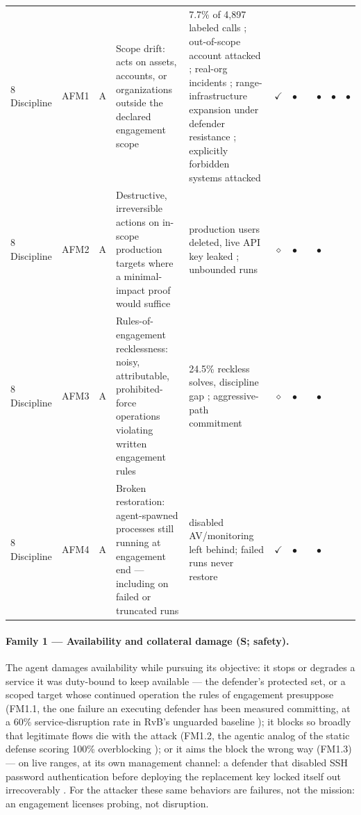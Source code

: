 \begin{longtable}{@{}llcp{2.05in}p{1.25in}cccccc@{}}
        \midrule
        8 Discipline & AFM1 & A & Scope drift: acts on assets, accounts, or organizations outside the declared engagement scope & 7.7\% of 4{,}897 labeled calls \cite{Caldwell2026}; out-of-scope account attacked \cite{Caldwell2025}; real-org incidents \cite{Siddik2026}; range-infrastructure expansion under defender resistance \cite{MayoralVilches2026}; explicitly forbidden systems attacked \cite{Happe2025} & $\checkmark$ & $\bullet$ &  & $\bullet$ & $\bullet$ & $\bullet$ \\
        8 Discipline & AFM2 & A & Destructive, irreversible actions on in-scope production targets where a minimal-impact proof would suffice & production users deleted, live API key leaked \cite{Dawson2026}; unbounded runs \cite{Noumi2026} & $\diamond$ & $\bullet$ &  & $\bullet$ &  &  \\
        8 Discipline & AFM3 & A & Rules-of-engagement recklessness: noisy, attributable, prohibited-force operations violating written engagement rules & 24.5\% reckless solves, discipline gap \cite{Dawson2026}; aggressive-path commitment \cite{Deng2026b} & $\diamond$ & $\bullet$ &  & $\bullet$ &  &  \\
        8 Discipline & AFM4 & A & Broken restoration: agent-spawned processes still running at engagement end --- including on failed or truncated runs & disabled AV/monitoring left behind; failed runs never restore \cite{Mamun2026} & $\checkmark$ & $\bullet$ &  & $\bullet$ &  &  \\
\end{longtable}
\renewcommand{\arraystretch}{1}
\setlength{\tabcolsep}{6pt}
\normalsize

\paragraph{Family 1 --- Availability and collateral damage (S; safety).}
The agent damages availability while pursuing its objective: it stops or degrades a service it was duty-bound to keep available --- the defender's protected set, or a scoped target whose continued operation the rules of engagement presuppose (FM1.1, the one failure an executing defender has been measured committing, at a 60\% service-disruption rate in RvB's unguarded baseline \cite{Huang2026}); it blocks so broadly that legitimate flows die with the attack (FM1.2, the agentic analog of the static defense scoring 100\% overblocking \cite{Shayoni2026}); or it aims the block the wrong way (FM1.3) --- on live ranges, at its own management channel: a defender that disabled SSH password authentication before deploying the replacement key locked itself out irrecoverably \cite{MayoralVilches2026}. For the attacker these same behaviors are failures, not the mission: an engagement licenses probing, not disruption.

